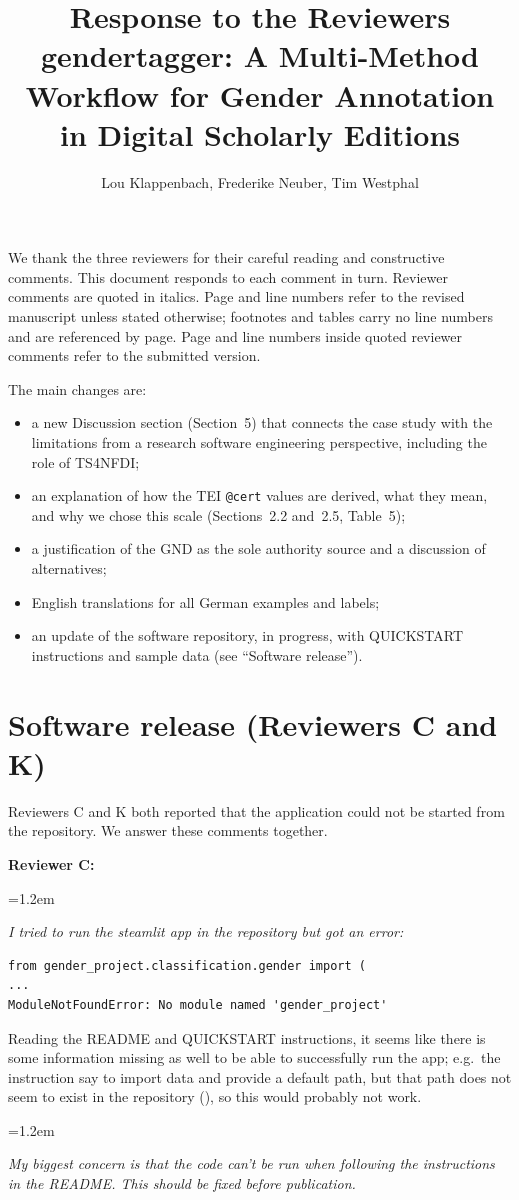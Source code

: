 \documentclass[11pt,a4paper]{article}
\title{Response to the Reviewers\\[0.3em]
  \large gendertagger: A Multi-Method Workflow for Gender Annotation in Digital Scholarly Editions}
\author{Lou Klappenbach, Frederike Neuber, Tim Westphal}
\date{}
\newenvironment{reviewercomment}
  {\par\smallskip\begin{list}{}{\leftmargin=1.2em\rightmargin=0pt}\item[]\color{black!75}\itshape}
  {\end{list}\smallskip}
\begin{document}
\maketitle

We thank the three reviewers for their careful reading and constructive comments. This document
responds to each comment in turn. Reviewer comments are quoted in italics. Page and line numbers
refer to the revised manuscript unless stated otherwise; footnotes and tables carry no line numbers and
are referenced by page. Page and line numbers inside quoted reviewer comments refer to the submitted
version.

The main changes are:
\begin{itemize}[nosep]
  \item a new Discussion section (Section~5) that connects the case study with the limitations from
        a research software engineering perspective, including the role of TS4NFDI;
  \item an explanation of how the TEI \texttt{@cert} values are derived, what they mean, and why we
        chose this scale (Sections~2.2 and~2.5, Table~5);
  \item a justification of the GND as the sole authority source and a discussion of alternatives;
  \item English translations for all German examples and labels;
  \item an update of the software repository, in progress, with QUICKSTART instructions and sample
        data (see ``Software release'').
\end{itemize}

\section*{Software release (Reviewers C and K)}

Reviewers C and K both reported that the application could not be started from the repository. We
answer these comments together.

\textbf{Reviewer C:}
\begin{reviewercomment}
I tried to run the steamlit app in the repository but got an error:
\begin{Verbatim}[fontsize=\small]
from gender_project.classification.gender import (
...
ModuleNotFoundError: No module named 'gender_project'
\end{Verbatim}
Reading the README and QUICKSTART instructions, it seems like there is some information missing as
well to be able to successfully run the app; e.g.\ the instruction say to import data and provide a
default path, but that path does not seem to exist in the repository
(), so this would probably not work.
\end{reviewercomment}
\begin{reviewercomment}
My biggest concern is that the code can't be run when following the instructions in the README.
This should be fixed before publication.
\end{reviewercomment}
\end{document}
